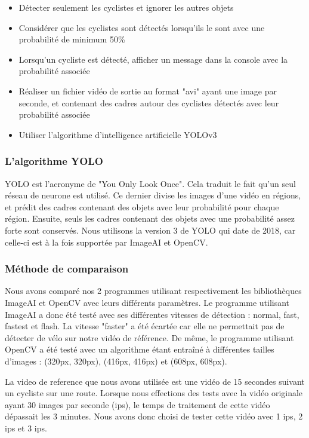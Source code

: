 \begin{itemize}
    \item Détecter seulement les cyclistes et ignorer les autres objets
    \item Considérer que les cyclistes sont détectés lorsqu'ils le sont avec une probabilité de minimum 50\%
    \item Lorsqu'un cycliste est détecté, afficher un message dans la console avec la probabilité associée
    \item Réaliser un fichier vidéo de sortie au format "avi" ayant une image par seconde, et contenant des cadres autour des cyclistes détectés avec leur probabilité associée
    \item Utiliser l'algorithme d'intelligence artificielle YOLOv3
\end{itemize}

\subsubsection{L'algorithme YOLO}
\label{sec:comparaisonIA:methode_recherche:yolo}

YOLO est l'acronyme de "You Only Look Once". Cela traduit le fait qu'un seul réseau de neurone est utilisé. \cite{Yolov3}
Ce dernier divise les images d'une vidéo en régions, et prédit des cadres contenant des objets avec leur probabilité pour chaque région.
Ensuite, seuls les cadres contenant des objets avec une probabilité assez forte sont conservés.
Nous utilisons la version 3 de YOLO qui date de 2018, car celle-ci est à la fois supportée par ImageAI et OpenCV.

\subsubsection{Méthode de comparaison}
\label{sec:comparaisonIA:methode_recherche:methode_comparaison}

Nous avons comparé nos 2 programmes utilisant respectivement les bibliothèques ImageAI et OpenCV avec leurs différents paramètres.
Le programme utilisant ImageAI a donc été testé avec ses différentes vitesses de détection : normal, fast, fastest et flash.
La vitesse "faster" a été écartée car elle ne permettait pas de détecter de vélo sur notre vidéo de référence.
De même, le programme utilisant OpenCV a été testé avec un algorithme étant entraîné à différentes tailles d'images :
(320px, 320px), (416px, 416px) et (608px, 608px).

La \gls{video de reference} que nous avons utilisée est une vidéo de 15 secondes suivant un cycliste sur une route.
Lorsque nous effections des tests avec la vidéo originale ayant 30 images par seconde (ips),
le temps de traitement de cette vidéo dépassait les 3 minutes.
Nous avons donc choisi de tester cette vidéo avec 1 ips, 2 ips et 3 ips.

